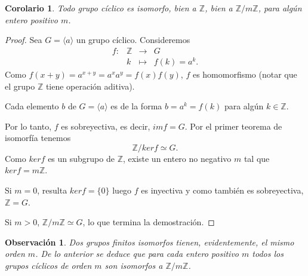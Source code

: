 \documentclass[12pt]{article}
\newtheorem{corolario}{Corolario}[theorem]
\newtheorem{observation}{Observación}[theorem]
\begin{document}
\begin{corolario}Todo grupo cíclico es isomorfo, bien a $\mathbb{Z}$, bien a $\mathbb{Z}/m\mathbb{Z}$, para algún entero positivo $m$.
\end{corolario}
\begin{proof}
Sea $G = \langle a \rangle$ un grupo cíclico. Consideremos $$\begin{array}{rccl}
f\colon &\mathbb{Z}& \longrightarrow &G\\
&k& \longmapsto &f(k) = a^k.
\end{array}
$$Como $f(x+y) = a^{x+y} = a^xa^y = f(x) f(y)$, $f$ es homomorfismo (notar que el grupo $\mathbb{Z}$ tiene operación aditiva).

Cada elemento $b$ de $G = \langle a \rangle$ es de la forma $b = a^k = f(k)$ para algún $k \in \mathbb{Z}$. 

Por lo tanto, $f$ es sobreyectiva, es decir, $im f = G$. Por el primer teorema de isomorfía tenemos $$\mathbb{Z}/ker f \simeq G.$$ Como $ker f$ es un subgrupo de $\mathbb{Z}$, existe un entero no negativo $m$ tal que $ker f = m \mathbb{Z}$. 

Si $m = 0$, resulta $ker f = \lbrace 0 \rbrace$ luego $f$ es inyectiva y como también es sobreyectiva, $\mathbb{Z} = G$. 

Si $m >0$, $\mathbb{Z}/m\mathbb{Z} \simeq G$, lo que termina la demostración.

\end{proof}

\begin{observation}Dos grupos finitos isomorfos tienen, evidentemente, el mismo orden $m$. De lo anterior se deduce que para cada entero positivo $m$ todos los grupos cíclicos de orden $m$ son isomorfos a $\mathbb{Z}/m\mathbb{Z}$.
\end{observation}
\end{document}
